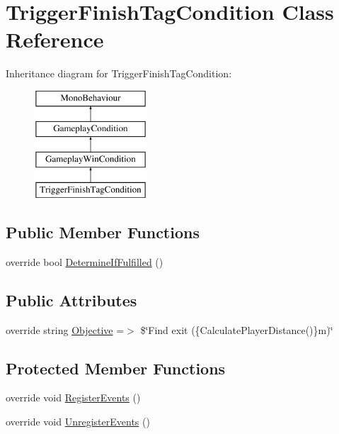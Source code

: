 \hypertarget{class_trigger_finish_tag_condition}{}\section{Trigger\+Finish\+Tag\+Condition Class Reference}
\label{class_trigger_finish_tag_condition}
Inheritance diagram for Trigger\+Finish\+Tag\+Condition\+:\begin{figure}[H]
\begin{center}
\leavevmode
\includegraphics[height=4.000000cm]{class_trigger_finish_tag_condition}
\end{center}
\end{figure}
\subsection*{Public Member Functions}
\begin{DoxyCompactItemize}
\item 
override bool \mbox{\hyperlink{class_trigger_finish_tag_condition_a2093b9932e1b90d51e5f6c25caeec514}{Determine\+If\+Fulfilled}} ()
\end{DoxyCompactItemize}
\subsection*{Public Attributes}
\begin{DoxyCompactItemize}
\item 
override string \mbox{\hyperlink{class_trigger_finish_tag_condition_ac5fc9659ba847adf7f1860bd3ea056f3}{Objective}} =$>$ \$\char`\"{}Find exit (\{Calculate\+Player\+Distance()\}m)\char`\"{}
\end{DoxyCompactItemize}
\subsection*{Protected Member Functions}
\begin{DoxyCompactItemize}
\item 
override void \mbox{\hyperlink{class_trigger_finish_tag_condition_a3c0f0bfe28375ed9c3c9f42c916b473f}{Register\+Events}} ()
\item 
override void \mbox{\hyperlink{class_trigger_finish_tag_condition_a53d94c37b0464e8c450bbc4800ff62d5}{Unregister\+Events}} ()
\end{DoxyCompactItemize}
